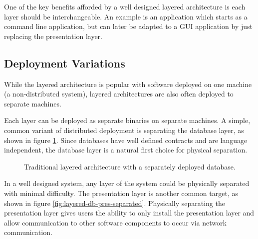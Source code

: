 One of the key benefits afforded by a well designed layered architecture is each layer should be interchangeable.
An example is an application which starts as a command line application,
but can later be adapted to a GUI application by just replacing the presentation layer.

\subsection{Deployment Variations}

While the layered architecture is popular with software deployed on one machine (a non-distributed system),
layered architectures are also often deployed to separate machines.

Each layer can be deployed as separate binaries on separate machines.
A simple, common variant of distributed deployment is separating the database layer,
as shown in figure \ref{fig:layered-db-separated}.
Since databases have well defined contracts and are language independent,
the database layer is a natural first choice for physical separation.

\begin{figure}[ht]
    \centering
    \caption{Traditional layered architecture with a separately deployed database.}
    \label{fig:layered-db-separated}
\end{figure}

In a well designed system, any layer of the system could be physically separated with minimal difficulty.
The presentation layer is another common target, as shown in figure \ref{fig:layered-db-pres-separated}.
Physically separating the presentation layer gives users the ability to only install the presentation layer and allow communication to
other software components to occur via network communication.

